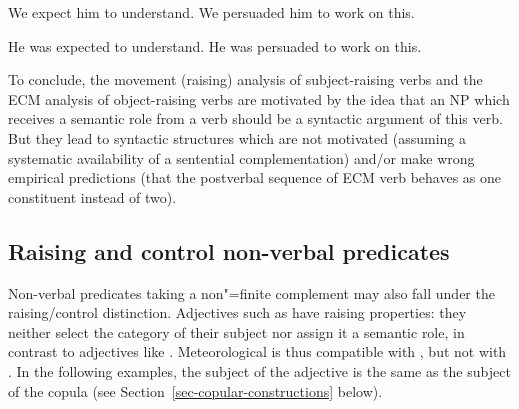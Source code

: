 \begin{exe}
\ex
\begin{xlist} \label{pro}
\ex We expect him to understand.
\ex  We persuaded him to work on this.
\end{xlist}
\ex \begin{xlist} \label{passive}
\ex  He was expected to understand.
\ex  He was persuaded to work on this.
\end{xlist}
	
\end{exe}


To conclude, the movement (raising) analysis of subject-raising verbs and the ECM analysis of object-raising verbs are motivated by the idea that an NP which receives a semantic role from a verb should be a syntactic argument of this verb.
But they lead to syntactic structures which are not motivated (assuming a systematic availability of a sentential complementation) and/or make wrong empirical predictions (that the postverbal sequence of ECM verb behaves as one constituent instead of two).
 
\subsection{Raising and control non-verbal predicates}\label{nonverbal}

Non-verbal predicates taking a non"=finite complement may also fall under the raising/control distinction.  Adjectives such as  have raising properties: they neither select the category of their subject nor assign it a semantic role, in contrast to adjectives like . Meteorological  is thus compatible with , but not with . In the following examples, the subject of the adjective is the same as the subject of the copula (see Section~\ref{sec-copular-constructions} below).

\eal
{}
\zl

